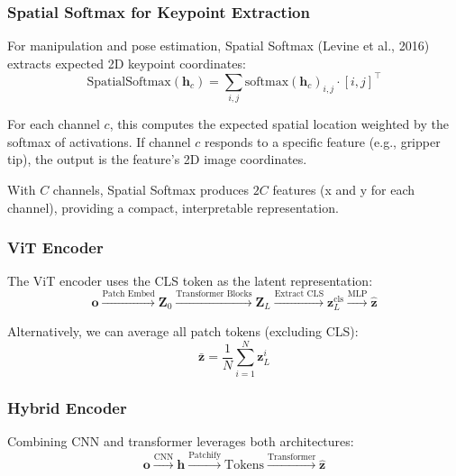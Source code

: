 \subsubsection{Spatial Softmax for Keypoint Extraction}

For manipulation and pose estimation, Spatial Softmax (Levine et al., 2016) extracts expected 2D keypoint coordinates:
\begin{equation}
\text{SpatialSoftmax}(\mathbf{h}_c) = \sum_{i,j} \text{softmax}(\mathbf{h}_c)_{i,j} \cdot [i, j]^\top
\label{eq:spatial_softmax}
\end{equation}

For each channel $c$, this computes the expected spatial location weighted by the softmax of activations. If channel $c$ responds to a specific feature (e.g., gripper tip), the output is the feature's 2D image coordinates.

With $C$ channels, Spatial Softmax produces $2C$ features (x and y for each channel), providing a compact, interpretable representation.

\subsubsection{ViT Encoder}

The ViT encoder uses the CLS token as the latent representation:
\begin{equation}
\mathbf{o} \xrightarrow{\text{Patch Embed}} \mathbf{Z}_0 \xrightarrow{\text{Transformer Blocks}} \mathbf{Z}_L \xrightarrow{\text{Extract CLS}} \mathbf{z}_L^{\text{cls}} \xrightarrow{\text{MLP}} \hat{\mathbf{z}}
\label{eq:vit_encoder}
\end{equation}

Alternatively, we can average all patch tokens (excluding CLS):
\begin{equation}
\bar{\mathbf{z}} = \frac{1}{N} \sum_{i=1}^{N} \mathbf{z}_L^i
\label{eq:vit_mean_pool}
\end{equation}

\subsubsection{Hybrid Encoder}

Combining CNN and transformer leverages both architectures:
\begin{equation}
\mathbf{o} \xrightarrow{\text{CNN}} \mathbf{h} \xrightarrow{\text{Patchify}} \text{Tokens} \xrightarrow{\text{Transformer}} \hat{\mathbf{z}}
\label{eq:hybrid_encoder}
\end{equation}

